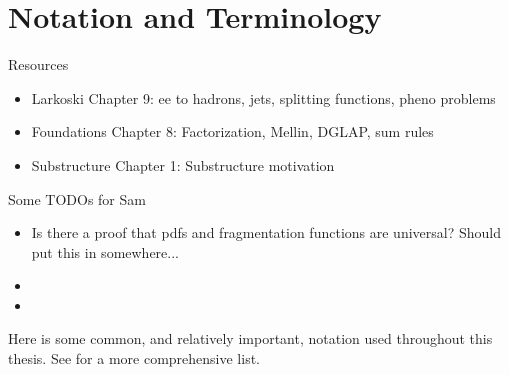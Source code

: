\section*{Notation and Terminology}

\begin{sambox}{Resources}{}
    \begin{itemize}
        \item
            Larkoski Chapter 9:
            ee to hadrons, jets, splitting functions, pheno problems

        \item
            Foundations Chapter 8:
            Factorization, Mellin, DGLAP, sum rules

        \item
            Substructure Chapter 1:
            Substructure motivation
    \end{itemize}
\end{sambox}

\begin{sambox}{Some TODOs for Sam}{}
    \begin{itemize}
        \item
            Is there a proof that pdfs and fragmentation functions are universal?
            Should put this in somewhere...

        \item

        \item
    \end{itemize}
\end{sambox}

Here is some common, and relatively important, notation used throughout this thesis.
%
See  for a more comprehensive list.

